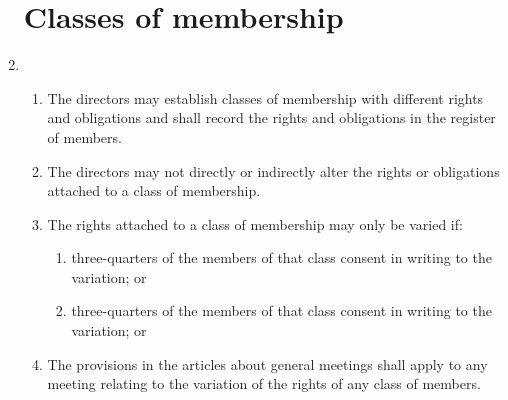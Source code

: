 \documentclass{article}
\begin{document}
\begin{enumerate}[label=\arabic*]
    \section{Classes of membership}
    \item \begin{enumerate}[label=(\arabic*)]
        \item The directors may establish classes of membership with
        different rights and obligations and shall record the rights and
        obligations in the register of members.
        \item The directors may not directly or indirectly alter the rights or
        obligations attached to a class of membership.
        \item The rights attached to a class of membership may only be
        varied if:
        \begin{enumerate}[label=(\arabic*)]
            \item three-quarters of the members of that class consent in
            writing to the variation; or
            \item three-quarters of the members of that class consent in
            writing to the variation; or
        \end{enumerate}
        \item The provisions in the articles about general meetings shall apply
        to any meeting relating to the variation of the rights of any class
        of members.
    \end{enumerate}
    

\end{enumerate}
\end{document}

